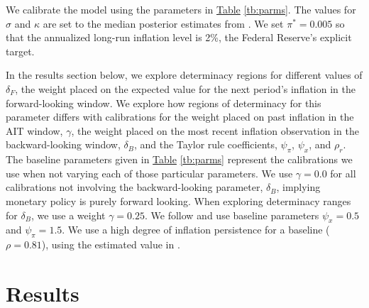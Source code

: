 \documentclass[english,authoryear,12pt]{elsarticle}
\begin{document}
We calibrate the model using the parameters in \href{tb:parms}{Table} \ref{tb:parms}. The values for $\sigma$ and $\kappa$ are set to the median posterior estimates from \citet{smetswouters2007}. We set $\pi^*=0.005$ so that the annualized long-run inflation level is 2\%, the Federal Reserve's explicit target.

In the results section below, we explore determinacy regions for different values of $\delta_F$, the weight placed on the expected value for the next period's inflation in the forward-looking window. We explore how regions of determinacy for this parameter differs with calibrations for the weight placed on past inflation in the AIT window, $\gamma$, the weight placed on the most recent inflation observation in the backward-looking window, $\delta_B$, and the Taylor rule coefficients, $\psi_\pi$, $\psi_x$, and $\rho_r$. The baseline parameters given in \href{tb:parms}{Table} \ref{tb:parms} represent the calibrations we use when not varying each of those particular parameters. We use $\gamma=0.0$ for all calibrations not involving the backward-looking parameter, $\delta_B$, implying monetary policy is purely forward looking. When exploring determinacy ranges for $\delta_B$, we use a weight $\gamma=0.25$. We follow \citet{taylor1993} and use baseline parameters  $\psi_x=0.5$ and $\psi_\pi = 1.5$. We use a high degree of inflation persistence for a baseline ($\rho=0.81$), using the estimated value in \citet{smetswouters2007}.

\section{Results}
\end{document}
